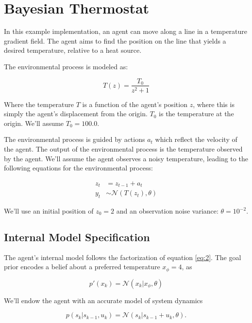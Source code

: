 \documentclass{article}
\begin{document}
\section{Bayesian Thermostat}
In this example implementation, an agent can move along a line in a temperature gradient field. The agent aims to find the position on the line that yields a desired temperature, relative to a heat source.

The environmental process is modeled as: 

\begin{equation}\label{eq:8}
T(z) = \frac{T_0}{z^2 + 1}
\end{equation} 

Where the temperature $T$ is a function of the agent's position $z$, where this is simply the agent's displacement from the origin. $T_0$ is the temperature at the origin. We'll assume $T_0 = 100.0$.

The environmental process is guided by actions $a_t$ which reflect the velocity of the agent. The output of the environmental process is the temperature observed by the agent. We'll assume the agent observes a noisy temperature, leading to the following equations for the environmental process: 

\begin{subequations}\label{eq:9}
\begin{align}
z_t &= z_{t-1} + a_t \label{eq:9a} \\
y_t &\sim \mathcal{N}(T(z_t), \theta) \label{eq:9b}
\end{align}
\end{subequations}

We'll use an initial position of $z_0 = 2$ and an observation noise variance: $\theta = 10^{-2}$.

\subsection{Internal Model Specification}

The agent's internal model follows the factorization of equation \ref{eq:2}. The goal prior encodes a belief about a preferred temperature $x_\phi = 4$, as

\begin{equation}\label{eq:10}
p'(x_k)=\mathcal{N}(x_k|x_\phi, \theta)
\end{equation}

We'll endow the agent with an accurate model of system dynamics

\begin{equation}\label{eq:11}
p(s_k | s_{k-1}, u_k) = \mathcal{N}(s_k | s_{k-1} + u_k, \theta).
\end{equation}
\end{document}
